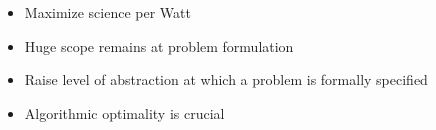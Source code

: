\documentclass{beamer}
\begin{document}
\begin{comment}
\begin{frame}{Nonlinear methods}
  \begin{itemize}
  \item Global linearization (NewtonLS, NewtonTR)
    \begin{itemize}
    \item Preconditioning libraries for assembled matrices, amortize setup cost
    \item Low arithmetic intensity
    \end{itemize}
  \item Quasi-Newton
    \begin{itemize}
    \item Build low-rank updates to Jacobian inverse
    \item B. and Brune, ``Low-rank quasi-Newton updates for robust Jacobian lagging in Newton-type methods'', ANS MC13.
    \end{itemize}
  \item Nonlinear multigrid and domain decomposition
    \begin{itemize}
    \item ASPIN (left-preconditioned nonlinear Schwarz), also right-preconditioned
    \item Full Approximation Scheme with linear or nonlinear smoothers
    \item More intrusive, but freakishly efficient for difficult problems
    \end{itemize}
  \item Nonlinear GMRES, Anderson mixing, nonlinear CG
    \begin{itemize}
    \item Accelerator for nonlinear preconditioning
    \item Good alternative to matrix-free finite differencing
    \item More robust line search possible: operates in reduced basis
    \end{itemize}
  \end{itemize}
\end{frame}

\begin{frame}
  \texttt{[image: figures/BruneNGMRESFAS2.png]}
\end{frame}
\end{comment}

% 
% 
% 
% 

\begin{frame}\LARGE
  \begin{itemize}
  \item Maximize science per Watt
  \item Huge scope remains at problem formulation
  \item Raise level of abstraction at which a problem is formally specified
  \item Algorithmic optimality is crucial
  \end{itemize}
\end{frame}
\end{document}
